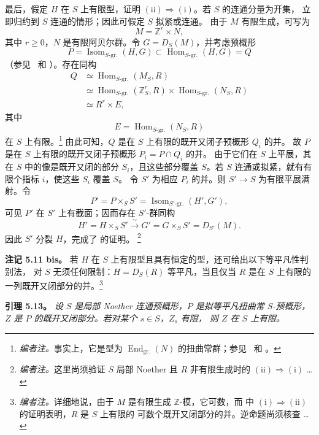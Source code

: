 最后，假定 \(H\) 在 \(S\) 上有限型，证明
\(\mathrm{(ii)}\Rightarrow\mathrm{(i)}\)。若 \(S\) 的连通分量为开集，
立即归约到 \(S\) 连通的情形；因此可假定 \(S\) 拟紧或连通。
由于 \(M\) 有限生成，可写为
\[
  M=\mathbb Z^r\times N,
\]
其中 \(r\geq 0\)，\(N\) 是有限阿贝尔群。令 \(G=D_S(M)\)，并考虑预概形
\[
  P=\operatorname{Isom}_{S\text{-gr.}}(H,G)
  \subset
  \operatorname{Hom}_{S\text{-gr.}}(H,G)=Q
\]
（参见\  和
）。存在同构
\begin{align*}
  Q
  &\simeq \operatorname{Hom}_{S\text{-gr.}}(M_S,R)\\
  &\simeq
    \operatorname{Hom}_{S\text{-gr.}}(\mathbb Z^r_S,R)
    \times
    \operatorname{Hom}_{S\text{-gr.}}(N_S,R)\\
  &\simeq R^r\times E,
\end{align*}
其中
\[
  E=\operatorname{Hom}_{S\text{-gr.}}(N_S,R)
\]
在 \(S\) 上有限。\footnote{\textit{编者注。}事实上，它是型为
\(\operatorname{End}_{\mathrm{gr.}}(N)\) 的扭曲常群；参见\
 和 。}
由此可知，\(Q\) 是在 \(S\) 上有限的既开又闭子预概形 \(Q_i\) 的并。
故 \(P\) 是在 \(S\) 上有限的既开又闭子预概形 \(P_i=P\cap Q_i\) 的并。
由于它们在 \(S\) 上平展，其在 \(S\) 中的像是既开又闭的部分 \(S_i\)，且这些部分覆盖
\(S\)。若 \(S\) 连通或拟紧，就有有限个指标 \(i\)，使这些 \(S_i\) 覆盖 \(S\)。
令 \(S'\) 为相应 \(P_i\) 的并。则 \(S'\to S\) 为有限平展满射。令
\[
  P'=P\times_S S'
     =\operatorname{Isom}_{S'\text{-gr.}}(H',G'),
\]
可见 \(P'\) 在 \(S'\) 上有截面；因而存在 \(S'\)-群同构
\[
  H'=H\times_S S'
  \xrightarrow{\ \sim\ }
  G'=G\times_S S'=D_{S'}(M).
\]
因此 \(S'\) 分裂 \(H\)，完成了  的证明。
\footnote{\textit{编者注。}这里尚须验证 \(S\) 局部 Noether 且 \(R\) 非有限生成时的
\(\mathrm{(ii)}\Rightarrow\mathrm{(i)}\) \ldots}

\par\medskip\noindent
\textbf{注记 5.11 bis。}\enspace
若 \(H\) 在 \(S\) 上有限型且具有恒定的型，还可给出以下等平凡性判别法，
对 \(S\) 无须任何限制：\(H=D_S(R)\) 等平凡，当且仅当 \(R\) 是在 \(S\)
上有限的一列既开又闭部分的并。\footnote{\textit{编者注。}详细地说，由于 \(M\)
是有限生成 \(\mathbb Z\)-模，它可数，而 
中 \(\mathrm{(i)}\Rightarrow\mathrm{(ii)}\) 的证明表明，\(R\) 是 \(S\) 上有限的
可数个既开又闭部分的并。逆命题尚须核查 \ldots}

\par\medskip\noindent
\textbf{引理 5.13。}\enspace
\emph{设 \(S\) 是局部 Noether 连通预概形，\(P\) 是拟等平凡扭曲常 \(S\)-预概形，
\(Z\) 是 \(P\) 的既开又闭部分。若对某个 \(s\in S\)，\(Z_s\) 有限，
则 \(Z\) 在 \(S\) 上有限。}

